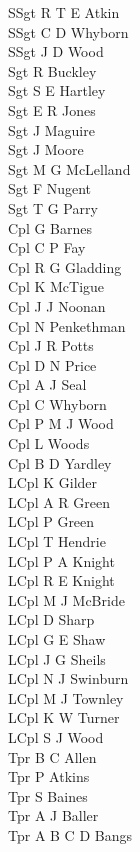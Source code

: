 \begin{multicols}{2}
  \noindent
  SSgt R T E Atkin \\
  SSgt C D Whyborn \\
  SSgt J D Wood \\
  Sgt R Buckley \\
  Sgt S E Hartley \\
  Sgt E R Jones \\
  Sgt J Maguire \\
  Sgt J Moore \\
  Sgt M G McLelland \\
  Sgt F Nugent \\
  Sgt T G Parry \\
  Cpl G Barnes \\
  Cpl C P Fay \\
  Cpl R G Gladding \\
  Cpl K McTigue \\
  Cpl J J Noonan \\
  Cpl N Penkethman \\
  Cpl J R Potts \\
  Cpl D N Price \\
  Cpl A J Seal \\
  Cpl C Whyborn \\
  Cpl P M J Wood \\
  Cpl L Woods \\
  Cpl B D Yardley \\
  LCpl K Gilder \\
  LCpl A R Green \\
  LCpl P Green \\
  LCpl T Hendrie \\
  LCpl P A Knight \\
  LCpl R E Knight \\
  LCpl M J McBride \\
  LCpl D Sharp \\
  LCpl G E Shaw \\
  LCpl J G Sheils \\
  LCpl N J Swinburn \\
  LCpl M J Townley \\
  LCpl K W Turner \\
  LCpl S J Wood \\
  Tpr B C Allen \\
  Tpr P Atkins \\
  Tpr S Baines \\
  Tpr A J Baller \\
  Tpr A B C D Bangs \\

\end{multicols}
